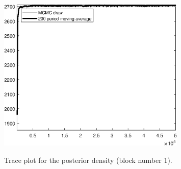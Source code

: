 \begin{figure}[H]
\centering
  \includegraphics[width=0.8\textwidth]{BRS_growth_ext_shopping/graphs/TracePlot_Posterior_blck_1}\\
    \caption{Trace plot for the posterior density (block number 1).}
\end{figure}
